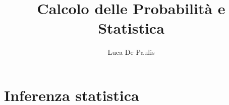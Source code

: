 \documentclass[italian,oneside,headinclude,10pt]{scrbook}
\begin{document}
\author{Luca De Paulis}
\title{Calcolo delle Probabilità e Statistica}
\maketitle

\tableofcontents












\chapter{Inferenza statistica}




\appendix

\end{document}
